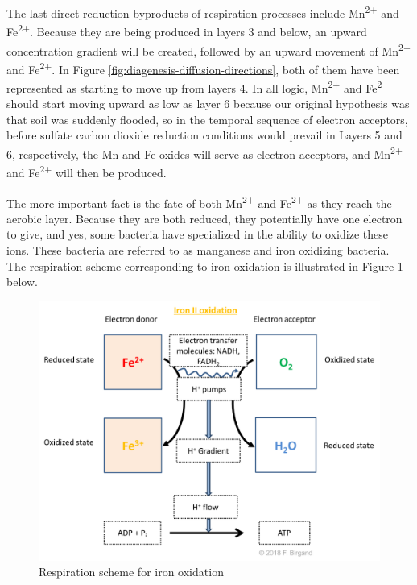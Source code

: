 \documentclass[]{book}
\theoremstyle{definition}
\theoremstyle{definition}
\theoremstyle{definition}
\theoremstyle{remark}
\begin{document}
The last direct reduction byproducts of respiration processes include
Mn\textsuperscript{2+} and Fe\textsuperscript{2+}. Because they are
being produced in layers 3 and below, an upward concentration gradient
will be created, followed by an upward movement of
Mn\textsuperscript{2+} and Fe\textsuperscript{2+}. In Figure
\ref{fig:diagenesis-diffusion-directions}, both of them have been
represented as starting to move up from layers 4. In all logic,
Mn\textsuperscript{2+} and Fe\textsuperscript{2} should start moving
upward as low as layer 6 because our original hypothesis was that soil
was suddenly flooded, so in the temporal sequence of electron acceptors,
before sulfate carbon dioxide reduction conditions would prevail in
Layers 5 and 6, respectively, the Mn and Fe oxides will serve as
electron acceptors, and Mn\textsuperscript{2+} and
Fe\textsuperscript{2+} will then be produced.

The more important fact is the fate of both Mn\textsuperscript{2+} and
Fe\textsuperscript{2+} as they reach the aerobic layer. Because they are
both reduced, they potentially have one electron to give, and yes, some
bacteria have specialized in the ability to oxidize these ions. These
bacteria are referred to as manganese and iron oxidizing bacteria. The
respiration scheme corresponding to iron oxidation is illustrated in
Figure \ref{fig:respiration-Fe-O2} below.

\begin{figure}

{\centering \includegraphics[width=0.75\linewidth]{pictures/respiration-Fe-O2} 

}

\caption{Respiration scheme for iron oxidation}\label{fig:respiration-Fe-O2}
\end{figure}
\end{document}
